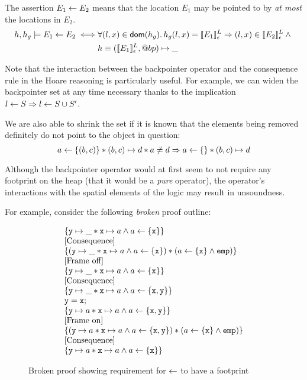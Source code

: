 \documentclass[a4paper,notitlepage]{report}
\begin{document}
The assertion $E_1 \leftarrow E_2$ means that the location $E_1$ may be pointed to by
\emph{at most} the locations in $E_2$.
\begin{align*}
  h, h_g \models E_1 \leftarrow E_2 \iff &
    \forall (l,x) \in \mathsf{dom}(h_g) \mathpunct{.} h_g(l,x) = \llbracket E_1 \rrbracket^L_\epsilon
    \Rightarrow (l,x) \in \llbracket E_2 \rrbracket^L_\epsilon \land {} \\
    & h \equiv (\llbracket E_1 \rrbracket^L_\epsilon, @bp) \mapsto \_
\end{align*}

Note that the interaction between the backpointer operator and the consequence rule in the
Hoare reasoning is particularly useful.
For example, we can widen the backpointer set at any time necessary thanks to
the implication $l \leftarrow S \Rightarrow l \leftarrow S \cup S'$.

We are also able to shrink the set if it is known that the elements being
removed definitely do not point to the object in question:
\[
  a \leftarrow \{(b,c)\} \mathbin{*} (b,c) \mapsto d \mathbin{*} a \not\doteq d \Rightarrow a \leftarrow \{\} \mathbin{*} (b,c) \mapsto d
\]

Although the backpointer operator would at first seem to not require any
footprint on the heap (that it would be a \emph{pure} operator), the operator's
interactions with the spatial elements of the logic may result in unsoundness.

For example, consider the following \emph{broken} proof outline:

\begin{figure}[h!]
\[
\begin{array}{l}
  \{\mathtt{y}\mapsto\_ \mathbin{*} \mathtt{x} \mapsto a \land a \leftarrow \{\mathtt{x}\} \}\\
  \text{[Consequence]}\\
  \{(\mathtt{y}\mapsto\_ \mathbin{*} \mathtt{x} \mapsto a \land a \leftarrow \{\mathtt{x}\}) \mathbin{*} (a \leftarrow \{\mathtt{x}\} \land \texttt{emp}) \}\\
  \text{[Frame off]}\\
  \{\mathtt{y}\mapsto\_ \mathbin{*} \mathtt{x} \mapsto a \land a \leftarrow \{\mathtt{x}\} \}\\
  \text{[Consequence]}\\
  \{\mathtt{y}\mapsto\_ \mathbin{*} \mathtt{x} \mapsto a \land a \leftarrow \{\mathtt{x},\mathtt{y}\} \}\\
  \mathtt{y = x;}\\
  \{\mathtt{y}\mapsto a \mathbin{*} \mathtt{x} \mapsto a \land a \leftarrow \{\mathtt{x},\mathtt{y}\} \}\\
  \text{[Frame on]}\\
  \{(\mathtt{y}\mapsto a \mathbin{*} \mathtt{x} \mapsto a \land a \leftarrow \{\mathtt{x},\mathtt{y}\}) \mathbin{*} (a \leftarrow \{\mathtt{x}\} \land \texttt{emp}) \}\\
  \text{[Consequence]}\\
  \{\mathtt{y}\mapsto a \mathbin{*} \mathtt{x} \mapsto a \land a \leftarrow \{\mathtt{x}\} \}\\
\end{array}
\]
\caption{Broken proof showing requirement for $\leftarrow$ to have a footprint}
\label{fig:proof-bp-broken}
\end{figure}
\end{document}
